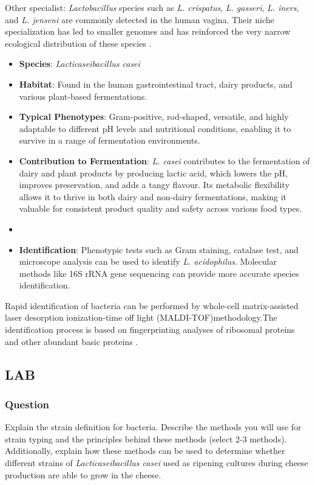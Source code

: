 \vspace*{0.5em}
Other specialist:
\textit{Lactobacillus} species such as \textit{L. crispatus}, \textit{L. gasseri}, \textit{L. iners}, and \textit{L. jenseni} are commonly detected in the human vagina. Their niche specialization has
led to smaller genomes and has reinforced the very narrow ecological distribution of these species \cite*{L3-LAB}.

\begin{itemize}
    \item \textbf{Species}: \textit{Lacticaseibacillus casei}
    \item \textbf{Habitat}: Found in the human gastrointestinal tract, dairy products, and various plant-based fermentations.
    \item \textbf{Typical Phenotypes}: Gram-positive, rod-shaped, versatile, and highly adaptable to different pH levels and nutritional conditions, enabling it to survive in a range of fermentation environments.
    \item \textbf{Contribution to Fermentation}: \textit{L. casei} contributes to the fermentation of dairy and plant products by producing lactic acid, which lowers the pH, improves preservation, and adds a tangy flavour. Its metabolic flexibility allows it to thrive in both dairy and non-dairy fermentations, making it valuable for consistent product quality and safety across various food types.
    \item \item \textbf{Identification}: Phenotypic tests such as Gram staining, catalase test, and microscope analysis can be used to identify \textit{L. acidophilus}. Molecular methods like 16S rRNA gene sequencing can provide more accurate species identification.
\end{itemize}

Rapid identification of bacteria can be performed by whole-cell matrix-assisted laser desorption ionization-time off light (MALDI-TOF)methodology.The identification process is based on fingerprinting analyses of ribosomal proteins and other abundant basic proteins \cite*{L9-Coryn}.

\subsection{LAB}
\subsubsection*{Question}
Explain the strain definition for bacteria. Describe the methods you will use for strain typing and the principles behind these methods (select 2-3 methods). Additionally, explain how these methods can be used to determine whether different strains of \textit{Lacticaseibacillus casei} used as ripening cultures during cheese production are able to grow in the cheese.

